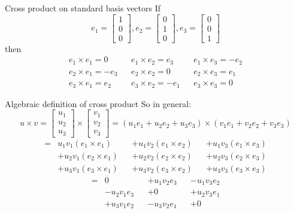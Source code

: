 \documentclass{beamer}
\begin{document}
\begin{frame}{Cross product on standard basis vectors}
If 
\begin{equation*}
e_1 = \left[
  \begin{array}{c}
  1\\
  0\\
  0
  \end{array}
  \right],
  e_2 = \left[
  \begin{array}{c}
  0\\
  1\\
  0
  \end{array}
  \right],
  e_3 = \left[
  \begin{array}{c}
  0\\
  0\\
  1
  \end{array}
  \right]
\end{equation*}
then 
\begin{align*}
e_1\times e_1 = 0 && e_1\times e_2 = e_3 && e_1\times e_3 = -e_2\\
e_2\times e_1 = -e_3 && e_2\times e_2 = 0 && e_2\times e_3 = e_1\\
e_3\times e_1 = e_2 && e_3\times e_2 = -e_1 && e_3\times e_3 = 0
\end{align*}
\end{frame}

\begin{frame}{Algebraic definition of cross product}
So in general:
\begin{equation*}
u\times v = \left[
\begin{array}{c}
u_1\\
u_2\\
u_3
\end{array}
\right]\times \left[
\begin{array}{c}
v_1\\
v_2\\
v_3
\end{array}
\right] =
\left(u_1e_1+u_2e_2+u_3e_3\right)\times \left(v_1e_1+v_2e_2+v_3e_3\right)
\end{equation*}
\begin{align*}
=&u_1v_1(e_1\times e_1) && +u_1v_2(e_1\times e_2)  && +u_1v_3(e_1\times e_3) \\
&+u_2v_1(e_2\times e_1) && +u_2v_2(e_2\times e_2) && +u_2v_3(e_2\times e_3 )\\
&+u_3v_1(e_3\times e_1)  && +u_3v_2(e_3\times e_2)  && +u_3v_3(e_3\times e_3)
\end{align*}
\begin{align*}
=&0 && +u_1v_2e_3  && -u_1v_3e_2 \\
&-u_2v_1e_3 && +0 && +u_2v_3e_1\\
&+u_3v_1e_2  && -u_3v_2e_1  && +0
\end{align*}
\end{frame}
\end{document}
